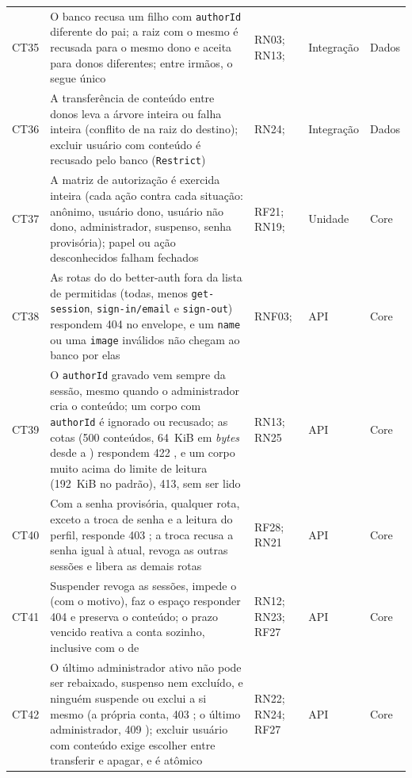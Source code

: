 \begin{longtable}{@{}L{1.1cm}L{7.0cm}L{2.2cm}L{1.6cm}L{1.6cm}@{}}
CT35 & O banco recusa um filho com \texttt{authorId} diferente do pai; a raiz com o mesmo  é recusada para o mesmo dono e aceita para donos diferentes; entre irmãos, o  segue único & RN03; RN13;  & Integração & Dados\\[2pt]
CT36 & A transferência de conteúdo entre donos leva a árvore inteira ou falha inteira (conflito de  na raiz do destino); excluir usuário com conteúdo é recusado pelo banco (\texttt{Restrict}) & RN24;  & Integração & Dados\\[2pt]
CT37 & A matriz de autorização é exercida inteira (cada ação contra cada situação: anônimo, usuário dono, usuário não dono, administrador, suspenso, senha provisória); papel ou ação desconhecidos falham fechados & RF21; RN19;  & Unidade & Core\\[2pt]
CT38 & As rotas do  do better-auth fora da lista de permitidas (todas, menos \texttt{get-session}, \texttt{sign-in/email} e \texttt{sign-out}) respondem 404 no envelope, e um \texttt{name} ou uma \texttt{image} inválidos não chegam ao banco por elas & RNF03;  & API & Core\\[2pt]
CT39 & O \texttt{authorId} gravado vem sempre da sessão, mesmo quando o administrador cria o conteúdo; um corpo com \texttt{authorId} é ignorado ou recusado; as cotas (500 conteúdos, 64~KiB em \emph{bytes} desde a ) respondem 422 , e um corpo muito acima do limite de leitura (192~KiB no padrão), 413, sem ser lido & RN13; RN25 & API & Core\\[2pt]
CT40 & Com a senha provisória, qualquer rota, exceto a troca de senha e a leitura do perfil, responde 403 ; a troca recusa a senha igual à atual, revoga as outras sessões e libera as demais rotas & RF28; RN21 & API & Core\\[2pt]
CT41 & Suspender revoga as sessões, impede o  (com o motivo), faz o espaço responder 404 e preserva o conteúdo; o prazo vencido reativa a conta sozinho, inclusive com o  de  & RN12; RN23; RF27 & API & Core\\[2pt]
CT42 & O último administrador ativo não pode ser rebaixado, suspenso nem excluído, e ninguém suspende ou exclui a si mesmo (a própria conta, 403 ; o último administrador, 409 ); excluir usuário com conteúdo exige escolher entre transferir e apagar, e é atômico & RN22; RN24; RF27 & API & Core\\[2pt]

\end{longtable}
